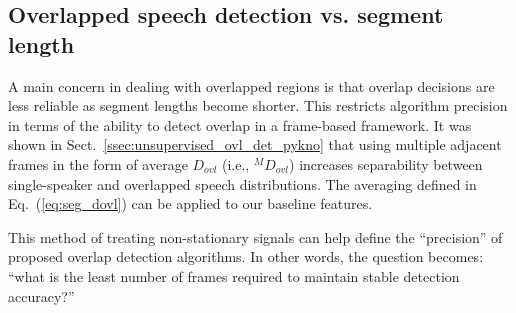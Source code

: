 {%


\subsection{Overlapped speech detection vs. segment length}
\label{sssec:ovl_frame_vs_seg}

A main concern in dealing with overlapped regions is that overlap decisions are less reliable as segment lengths become shorter. 
This restricts algorithm precision in terms of the ability to detect overlap in a frame-based framework. 
It was shown in Sect.~\ref{ssec:unsupervised_ovl_det_pykno} that using multiple adjacent frames in the form of average $D_{ovl}$ (i.e., $^MD_{ovl}$) increases separability between single-speaker and overlapped speech distributions. 
The averaging defined in Eq.~(\ref{eq:seg_dovl}) can be applied to our baseline features. 

This method of treating non-stationary signals can help define the ``precision'' of proposed overlap detection algorithms. 
In other words, the question becomes: ``what is the least number of frames required to maintain stable detection accuracy?'' 

}
